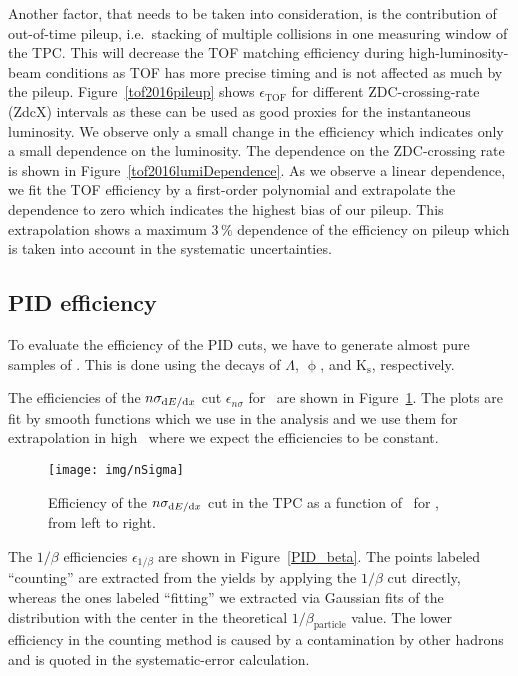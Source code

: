 Another factor, that needs to be taken into consideration, is the contribution of out-of-time pileup, i.e.\ stacking of multiple collisions in one measuring window of the TPC\@. This will decrease the TOF matching efficiency during high-luminosity-beam conditions as TOF has more precise timing and is not affected as much by the pileup. Figure~\ref{tof2016pileup} shows $\epsilon_\mathrm{TOF}$ for different ZDC-crossing-rate (ZdcX) intervals as these can be used as good proxies for the instantaneous luminosity. We observe only a small change in the efficiency which indicates only a small dependence on the luminosity. The dependence on the ZDC-crossing rate is shown in Figure~\ref{tof2016lumiDependence}. As we observe a linear dependence, we fit the TOF efficiency by a first-order polynomial and extrapolate the dependence to zero which indicates the highest bias of our pileup. This extrapolation shows a maximum $3\,\%$ dependence of the efficiency on pileup which is taken into account in the systematic uncertainties.

\subsection{PID efficiency\label{pidEff}}

To evaluate the efficiency of the PID cuts, we have to generate almost pure samples of \pKandpi\@. This is done using the decays of  $\Lambda$, $\upphi$, and  K$_\mathrm{s}$, respectively.

The efficiencies of the $n\sigma_{\dedx}$ cut $\epsilon_{n\sigma}$ for \piKandp\ are shown in Figure~\ref{PID_nsigma}\@. The plots are fit by smooth functions which we use in the analysis and we use them for extrapolation in high \pt\ where we expect the efficiencies to be constant.

\begin{figure}[!htb]
\centering
\texttt{[image: img/nSigma]}
\caption[Efficiency of the $n\sigma_{\dedx}$ cut in the TPC as a function of \pt.]{\label{PID_nsigma} Efficiency of the $n\sigma_{\dedx}$ cut in the TPC as a function of \pt\ for \piKandp, from left to right.}
\end{figure}


The $1/\beta$ efficiencies $\epsilon_{1/\beta}$ are shown in Figure~\ref{PID_beta}\@. The points labeled ``counting'' are extracted from the yields by applying the $1/\beta$ cut directly, whereas the ones labeled ``fitting'' we extracted via Gaussian fits of the distribution with the center in the theoretical $1/\beta_\text{particle}$ value. The lower efficiency in the counting method is caused by a contamination by other hadrons and is quoted in the systematic-error calculation.

